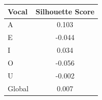 \begin{tabular}{lc}
\toprule
\rowcolor{col01}
Vocal & Silhouette Score \\
\midrule
A & 0.103 \\
E & -0.044 \\
I & 0.034 \\
O & -0.056 \\
U & -0.002 \\
Global & 0.007 \\
\bottomrule
\end{tabular}
